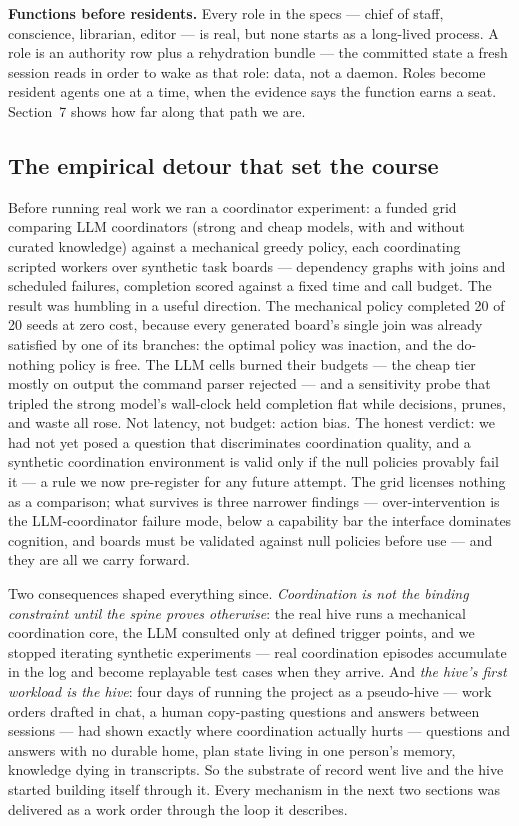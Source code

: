 \textbf{Functions before residents.} Every role in the specs --- chief of staff, conscience, librarian, editor --- is real, but none starts as a long-lived process. A role is an authority row plus a rehydration bundle --- the committed state a fresh session reads in order to wake as that role: data, not a daemon. Roles become resident agents one at a time, when the evidence says the function earns a seat. Section~7 shows how far along that path we are.

\subsection{The empirical detour that set the course}

Before running real work we ran a coordinator experiment: a funded grid comparing LLM coordinators (strong and cheap models, with and without curated knowledge) against a mechanical greedy policy, each coordinating scripted workers over synthetic task boards --- dependency graphs with joins and scheduled failures, completion scored against a fixed time and call budget. The result was humbling in a useful direction. The mechanical policy completed 20 of 20 seeds at zero cost, because every generated board's single join was already satisfied by one of its branches: the optimal policy was inaction, and the do-nothing policy is free. The LLM cells burned their budgets --- the cheap tier mostly on output the command parser rejected --- and a sensitivity probe that tripled the strong model's wall-clock held completion flat while decisions, prunes, and waste all rose. Not latency, not budget: action bias. The honest verdict: we had not yet posed a question that discriminates coordination quality, and a synthetic coordination environment is valid only if the null policies provably fail it --- a rule we now pre-register for any future attempt. The grid licenses nothing as a comparison; what survives is three narrower findings --- over-intervention is the LLM-coordinator failure mode, below a capability bar the interface dominates cognition, and boards must be validated against null policies before use --- and they are all we carry forward.

Two consequences shaped everything since. \emph{Coordination is not the binding constraint until the spine proves otherwise}: the real hive runs a mechanical coordination core, the LLM consulted only at defined trigger points, and we stopped iterating synthetic experiments --- real coordination episodes accumulate in the log and become replayable test cases when they arrive. And \emph{the hive's first workload is the hive}: four days of running the project as a pseudo-hive --- work orders drafted in chat, a human copy-pasting questions and answers between sessions --- had shown exactly where coordination actually hurts --- questions and answers with no durable home, plan state living in one person's memory, knowledge dying in transcripts. So the substrate of record went live and the hive started building itself through it. Every mechanism in the next two sections was delivered as a work order through the loop it describes.

